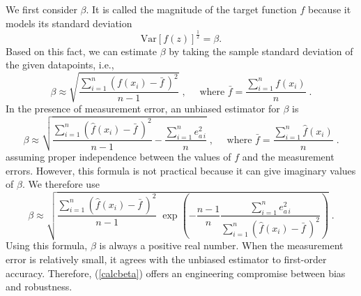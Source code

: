 We first consider $\beta$.  It is called the magnitude of the target function
$f$ because it models its standard deviation
\[ \mathrm{Var} \left[ f(z) \right]^{\frac12} = \beta . \]
Based on this fact, we can estimate $\beta$ by taking the sample standard
deviation of the given datapoints, i.e.,
\[ \beta \approx \sqrt{\dfrac{\sum_{i=1}^n (f(x_i) - {\bar f}\,)^2}{n-1}} \;,
   \quad \mbox{ where }{\bar f} = \frac{\sum_{i=1}^n f(x_i)}{n} \;. \]
In the presence of measurement error, an unbiased estimator for $\beta$ is
\[ \beta \approx \sqrt{\dfrac{\sum_{i=1}^n ({\hat f}(x_i) - {\bar f}\,)^2}{n-1}
   - \dfrac{\sum_{i=1}^n e_{a\,i}^2}{n}} \;,
   \quad \mbox{ where }{\bar f} = \frac{\sum_{i=1}^n {\hat f}(x_i)}{n} \;. \]
assuming proper independence between the values of $f$ and the measurement
errors.  However, this formula is not practical because it can give imaginary
values of $\beta$.  We therefore use
\begin{equation} \label{calcbeta}
\beta \approx \sqrt{\dfrac{
   \sum_{i=1}^n ({\hat f}(x_i) - {\bar f}\,)^2}{n-1} \;
   \exp\left(-\frac{n-1}{n}\dfrac{\sum_{i=1}^n e_{a\,i}^2}
               {\sum_{i=1}^n ({\hat f}(x_i) - {\bar f}\,)^2}\right) } \;.
\end{equation}
Using this formula, $\beta$ is always a positive real number.
When the measurement error is relatively small, it agrees with
the unbiased estimator to first-order accuracy.  Therefore, (\ref{calcbeta})
offers an engineering compromise between bias and robustness.

